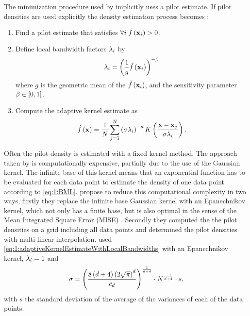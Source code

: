 The minimization procedure used by \citeauthor{breiman1977variable} implicitly uses a \KNN pilot estimate. If pilot densities are used explicitly the density estimation process becomes \cite{silverman1986density}:
	\begin{enumerate}[labelindent=0ex]
		\item Find a pilot estimate \varPilotDensityFunction{\varPattern} that satisfies $\forall i\; \varPilotDensityFunction{\varPattern[i]} > 0$. 

		\item Define local bandwidth factors $\lambda_{i}$ by
			\begin{equation}\label{eq:1:localBandwidth}
				\varLocalBandwidth{i} = \left( \frac{1}{g} \varPilotDensityFunction{\varPattern[i]} \right)^{- \varMBESensitivityParam}
			\end{equation}
			where $g$ is the geometric mean of the $\varPilotDensityFunction{\varPattern[i]}$, and the sensitivity parameter $\beta \in \left[0, 1\right]$.
		\item Compute the adaptive kernel estimate as
			\begin{equation}\label{eq:1:adaptiveKernelEstimateWithLocalBandwidths}
				\varEstimatedDensityFunction{\varPattern} = \frac{1}{\varNumPatterns} \sum_{j = 1}^{\varNumPatterns} \left(\varBandwidth\varLocalBandwidth{i}\right)^{-\varDim} \varKernel{\frac{\varPattern - \varPattern[j]}{\varBandwidth \varLocalBandwidth{i}}}.
			\end{equation}
	\end{enumerate}
Often the pilot density is estimated with a fixed kernel method. 
The approach taken by \citeauthor{breiman1977variable} is computationally expensive, partially due to the use of the Gaussian kernel. The infinite base of this kernel means that an exponential function has to be evaluated for each data point to estimate the density of one data point according to \cref{eq:1:BML}. \textcite{wilkinson1995dataplot} propose to reduce this computational complexity in two ways, firstly they replace the infinite base Gaussian kernel with an Epanechnikov kernel, which not only has a finite base, but is also optimal in the sense of the Mean Integrated Square Error (MISE) \cite{epanechnikov1969non}. Secondly they computed the the pilot densities on a grid including all data points and determined the pilot densities with multi-linear interpolation. \citeauthor{wilkinson1995dataplot} used \cref{eq:1:adaptiveKernelEstimateWithLocalBandwidths} with an Epanechnikov kernel, $\lambda_{i} = 1$ and 
	\begin{equation}\label{eq:1:wilkinsonHOpt}
		\sigma = \left(\frac{8\left(d + 4\right)\left(2 \sqrt{\pi}\right)^d}{c_d}\right)^{\frac{1}{d + 4}}\cdot N^{\frac{-1}{d + 4}} \cdot s,
	\end{equation}
	with $s$ the standard deviation of the average of the variances of each of the data points.

